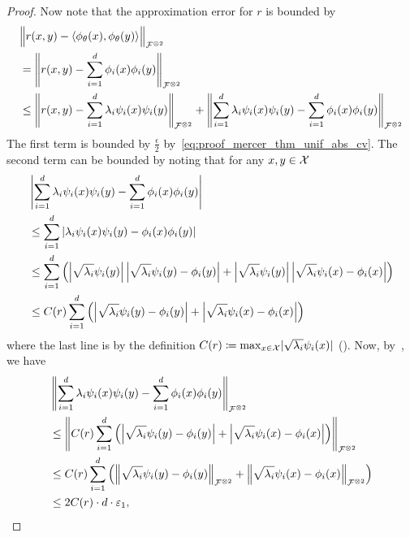 \begin{proof}
	Now note that the approximation error for $r$ is bounded by
	\begin{equation}\label{eq:proof_approx_bound}
		\begin{split}
			&\bignorm{r(x,y) - \langle \phi_\theta(x), \phi_\theta(y) \rangle}_{\calF^{\otimes 2}}\\
			&= \norm{ r(x,y) - \sum_{i=1}^{d}{\phi_i(x) \phi_i(y)}}_{\calF^{\otimes 2}} \\
			&\leq \norm{ r(x,y) - \sum_{i=1}^{d}{\lambda_i \psi_i(x) \psi_i(y)}}_{\calF^{\otimes 2}} + \norm{\sum_{i=1}^{d}\lambda_i \psi_i(x) \psi_i(y) - \sum_{i=1}^{d}\phi_i(x) \phi_i(y)}_{\calF^{\otimes 2}}
		\end{split}
	\end{equation}
	The first term is bounded by $\frac{\epsilon}{2}$ by~\eqref{eq:proof_mercer_thm_unif_abs_cv}. The second term can be bounded by noting that for any $x, y \in {\mathcal{X}}$
	\begin{equation*}
		\begin{split}
			&\left\lvert\sum_{i=1}^{d}\lambda_i \psi_i(x) \psi_i(y) - \sum_{i=1}^{d}\phi_i(x) \phi_i(y)\right\rvert \\
			&\leq \sum_{i=1}^{d}{ \left\lvert \lambda_i \psi_i(x) \psi_i(y) - \phi_i(x) \phi_i(y)\right\rvert} \\
			&\leq \sum_{i=1}^{d}{\left(
				\left\lvert\sqrt{\lambda_i} \psi_i(y)\right\rvert \left\lvert\sqrt{\lambda_i} \psi_i(y) - \phi_i(y)\right\rvert
				+ \left\lvert\sqrt{\lambda_i} \psi_i(y)\right\rvert \left\lvert\sqrt{\lambda_i} \psi_i(x) - \phi_i(x)\right\rvert
				\right)} \\
			&\leq C(r) \sum_{i=1}^{d}{\left(
				\left\lvert\sqrt{\lambda_i} \psi_i(y) - \phi_i(y)\right\rvert
				+ \left\lvert\sqrt{\lambda_i} \psi_i(x) - \phi_i(x)\right\rvert
				\right)} \\
		\end{split}
	\end{equation*}
	where the last line is by the definition $C(r) \coloneqq \max_{x \in {\mathcal{X}}} \lvert \sqrt{\lambda_i} \psi_i(x) \rvert$ (). Now, by~, we have
	\begin{align*}
		&\left\lVert\sum_{i=1}^{d}\lambda_i \psi_i(x) \psi_i(y) - \sum_{i=1}^{d}\phi_i(x) \phi_i(y)\right\rVert_{{\mathcal{F}}^{\otimes 2}} \\
		&\leq \left\lVert C(r) \sum_{i=1}^{d}{\left(\left\lvert\sqrt{\lambda_i} \psi_i(y) - \phi_i(y)\right\rvert + \left\lvert\sqrt{\lambda_i} \psi_i(x) - \phi_i(x)\right\rvert\right)}\right\rVert_{{\mathcal{F}}^{\otimes 2}}\\
		&\leq C(r) \sum_{i=1}^{d}\left(\left\lVert\sqrt{\lambda_i} \psi_i(y) - \phi_i(y)\right\rVert_{{\mathcal{F}}^{\otimes 2}} + \left\lVert\sqrt{\lambda_i} \psi_i(x) - \phi_i(x)\right\rVert_{{\mathcal{F}}^{\otimes 2}}\right)\\
		&\leq 2 C(r) \cdot d \cdot \varepsilon_1,
	\end{align*}


\end{proof}
